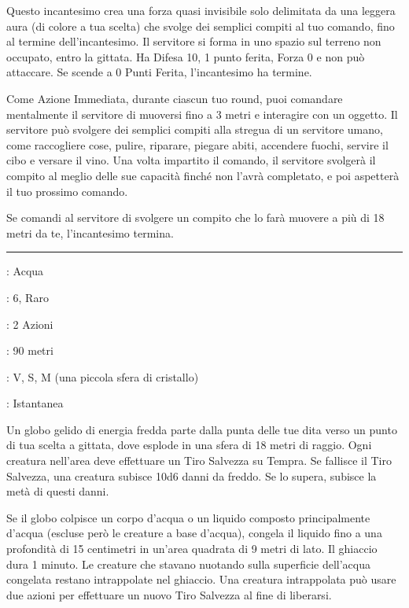\begin{multicols}{2}
Questo incantesimo crea una forza quasi invisibile solo delimitata da una leggera aura (di colore a tua scelta) che svolge dei semplici compiti al tuo comando, fino al termine dell'incantesimo. Il servitore si forma in uno spazio sul terreno non occupato, entro la gittata. Ha Difesa 10, 1 punto ferita, Forza 0 e non può attaccare. Se scende a 0 Punti Ferita, l'incantesimo ha termine.

Come Azione Immediata, durante ciascun tuo round, puoi comandare mentalmente il servitore di muoversi fino a 3 metri e interagire con un oggetto. Il servitore può svolgere dei semplici compiti alla stregua di un servitore umano, come raccogliere cose, pulire, riparare, piegare abiti, accendere fuochi, servire il cibo e versare il vino. Una volta impartito il comando, il servitore svolgerà il compito al meglio delle sue capacità finché non l'avrà completato, e poi aspetterà il tuo prossimo comando.

Se comandi al servitore di svolgere un compito che lo farà muovere a più di 18 metri da te, l'incantesimo termina.

\smallskip\noindent\rule{\linewidth}{2pt} \hypertarget{Sfera Congelante}{}\smallskip{}
\noindent
\begin{description}[noitemsep, topsep=0pt, parsep=0pt, partopsep=0pt, leftmargin=0cm, labelwidth=2.8cm]
	\item[\textbf{Lista di Magia}]: Acqua
	\item[\textbf{Livello}]: 6, Raro
	\item[\textbf{T. di Lancio}]: 2 Azioni
	\item[\textbf{Gittata}]: 90 metri
	\item[\textbf{Componenti}]: V, S, M (una piccola sfera di cristallo)
	\item[\textbf{Durata}]: Istantanea
\end{description}

Un globo gelido di energia fredda parte dalla punta delle tue dita verso un punto di tua scelta a gittata, dove esplode in una sfera di 18 metri di raggio. Ogni creatura nell'area deve effettuare un Tiro Salvezza su Tempra. Se fallisce il Tiro Salvezza, una creatura subisce 10d6 danni da freddo. Se lo supera, subisce la metà di questi danni.

Se il globo colpisce un corpo d'acqua o un liquido composto principalmente d'acqua (escluse però le creature a base d'acqua), congela il liquido fino a una profondità di 15 centimetri in un'area quadrata di 9 metri di lato. Il ghiaccio dura 1 minuto. Le creature che stavano nuotando sulla superficie dell'acqua congelata restano intrappolate nel ghiaccio. Una creatura intrappolata può usare due azioni per effettuare un nuovo Tiro Salvezza al fine di liberarsi.


\end{multicols}
